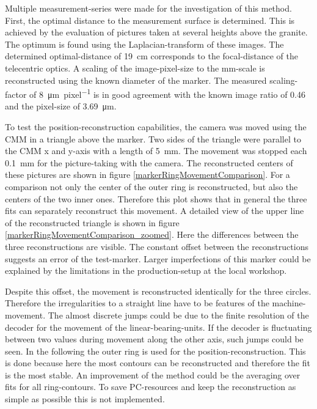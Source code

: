 \documentclass[
twoside,            %
BCOR1.4cm,          %
10pt,               %
headings=normal,    %
headsepline,        %
clearplainpage,		%
final,              %
div=14,
open=right,
bibliography=toc
]{scrreprt}
\begin{document}
Multiple measurement-series were made for the investigation of this method.
First, the optimal distance to the measurement surface is determined.
This is achieved by the evaluation of pictures taken at several heights above the granite.
The optimum is found using the Laplacian-transform of these images.
The determined optimal-distance of \SI{19}{cm} corresponds to the focal-distance of the telecentric optics.
A scaling of the image-pixel-size to the \si{mm}-scale is reconstructed using the known diameter of the marker.
The measured scaling-factor of \SI{8}{\micro\m\per pixel} is in good agreement with the known image ratio of 0.46 and the pixel-size of \SI{3.69}{\micro\m}.

To test the position-reconstruction capabilities, the camera was moved using the CMM in a triangle above the marker.
Two sides of the triangle were parallel to the CMM x and y-axis with a length of \SI{5}{mm}.
The movement was stopped each \SI{0.1}{mm} for the picture-taking with the camera.
The reconstructed centers of these pictures are shown in figure \ref{markerRingMovementComparison}.
For a comparison not only the center of the outer ring is reconstructed, but also the centers of the two inner ones.
Therefore this plot shows that in general the three fits can separately reconstruct this movement.
A detailed view of the upper line of the reconstructed triangle is shown in figure \ref{markerRingMovementComparison_zoomed}.
Here the differences between the three reconstructions are visible.
The constant offset between the reconstructions suggests an error of the test-marker.
Larger imperfections of this marker could be explained by the limitations in the production-setup at the local workshop.

Despite this offset, the movement is reconstructed identically for the three circles.
Therefore the irregularities to a straight line have to be features of the machine-movement.
The almost discrete jumps could be due to the finite resolution of the decoder for the movement of the linear-bearing-units.
If the decoder is fluctuating between two values during movement along the other axis, such jumps could be seen.
In the following the outer ring is used for the position-reconstruction. 
This is done because here the most contours can be reconstructed and therefore the fit is the most stable.
An improvement of the method could be the averaging over fits for all ring-contours.
To save PC-resources and keep the reconstruction as simple as possible this is not implemented.
\end{document}

